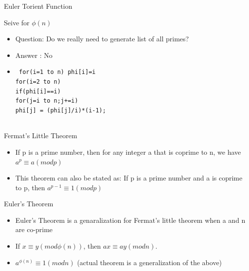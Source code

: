 \documentclass{beamer}
\begin{document}
\begin{frame}[<+->]{Euler Torient Function}
  \begin{block}{Seive for $\phi(n)$}
  \begin{itemize}
    \item Question: Do we really need to generate list of all primes?
    \item Answer : No
    \item 
    \tt{
	for(i=1 to n) phi[i]=i\\
	for(i=2 to n)\\
	  \hspace{2mm} if(phi[i]==i)\\
	    \hspace{5mm} for(j=i to n;j+=i)\\
	      \hspace{8mm} phi[j] = (phi[j]/i)*(i-1);\\
	}
  \end{itemize}
\end{block}
\end{frame}

\begin{frame}[<+->]{Fermat's Little Theorem}
  \begin{block}{}
  \begin{itemize}
    \item If p is a prime number, then for any integer a that is coprime to n, we have $a^p \equiv a (mod p)$\\
    \item This theorem can also be stated as: If p is a prime number and a is coprime to p, then $a^{p-1} \equiv 1 (mod p)$
  \end{itemize}
\end{block}
\end{frame}

\begin{frame}[<+->]{Euler's Theorem}
  \begin{block}{}
  \begin{itemize}
    \item Euler's Theorem is a genaralization for Fermat's little theorem when a and n are co-prime
    \item If $x \equiv y (mod \phi(n))$, then $ax \equiv ay (mod n)$.
    \item $a^{\phi(n)} \equiv 1 (mod n)$ (actual theorem is a generalization of the above)
  \end{itemize}
\end{block}
\end{frame}
\end{document}
